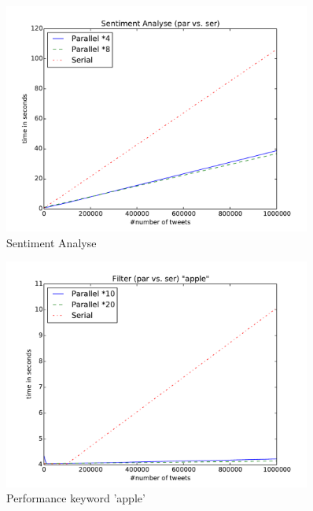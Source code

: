 \documentclass[12pt, oneside]{report}   	%
\begin{document}
\begin{figure}[htbp]
\begin{center}
\includegraphics[width=0.9\textwidth]{bilder/time_senitment_par-ser.pdf}
\caption{Sentiment Analyse}
\label{img:performancesentiment}
\end{center}
\end{figure}

\begin{figure}[htbp]
\begin{center}
\includegraphics[width=0.9\textwidth]{bilder/time_filter_apple.pdf}
\caption{Performance keyword 'apple'}
\label{img:performancefilter1}
\end{center}
\end{figure}
\end{document}
